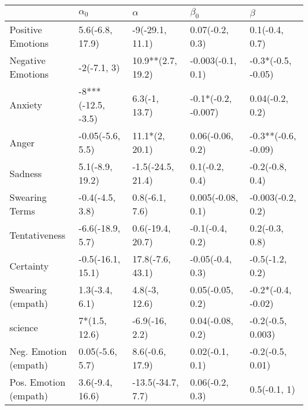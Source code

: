 \begin{tabular}{lllll}
\toprule
{} &          $\alpha_0$ &           $\alpha$ &            $\beta_0$ &              $\beta$ \\
\midrule
Positive Emotions     &     5.6(-6.8, 17.9) &    -9(-29.1, 11.1) &      0.07(-0.2, 0.3) &       0.1(-0.4, 0.7) \\
Negative Emotions     &         -2(-7.1, 3) &  10.9**(2.7, 19.2) &    -0.003(-0.1, 0.1) &   -0.3*(-0.5, -0.05) \\
Anxiety               &  -8***(-12.5, -3.5) &      6.3(-1, 13.7) &  -0.1*(-0.2, -0.007) &      0.04(-0.2, 0.2) \\
Anger                 &    -0.05(-5.6, 5.5) &     11.1*(2, 20.1) &     0.06(-0.06, 0.2) &  -0.3**(-0.6, -0.09) \\
Sadness               &     5.1(-8.9, 19.2) &  -1.5(-24.5, 21.4) &       0.1(-0.2, 0.4) &      -0.2(-0.8, 0.4) \\
Swearing Terms        &     -0.4(-4.5, 3.8) &     0.8(-6.1, 7.6) &    0.005(-0.08, 0.1) &    -0.003(-0.2, 0.2) \\
Tentativeness         &    -6.6(-18.9, 5.7) &   0.6(-19.4, 20.7) &      -0.1(-0.4, 0.2) &       0.2(-0.3, 0.8) \\
Certainty             &   -0.5(-16.1, 15.1) &   17.8(-7.6, 43.1) &     -0.05(-0.4, 0.3) &      -0.5(-1.2, 0.2) \\
Swearing (empath)     &      1.3(-3.4, 6.1) &      4.8(-3, 12.6) &     0.05(-0.05, 0.2) &   -0.2*(-0.4, -0.02) \\
science               &       7*(1.5, 12.6) &     -6.9(-16, 2.2) &     0.04(-0.08, 0.2) &    -0.2(-0.5, 0.003) \\
Neg. Emotion (empath) &     0.05(-5.6, 5.7) &    8.6(-0.6, 17.9) &      0.02(-0.1, 0.1) &     -0.2(-0.5, 0.01) \\
Pos. Emotion (empath) &     3.6(-9.4, 16.6) &  -13.5(-34.7, 7.7) &      0.06(-0.2, 0.3) &         0.5(-0.1, 1) \\
\bottomrule
\end{tabular}
